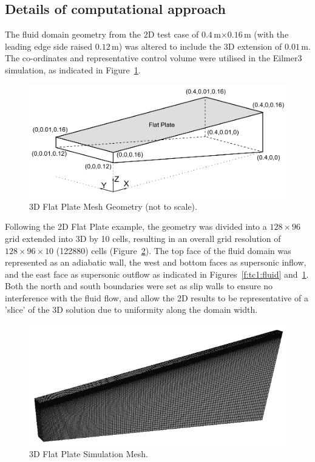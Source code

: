 \subsection{Details of computational approach}
The fluid domain geometry from the 2D test case of $0.4$\,m$\times0.16$\,m (with the leading edge side raised $0.12$\,m) was altered to include the 3D extension of $0.01$\,m. The co-ordinates and representative control volume were utilised in the Eilmer3 simulation, as indicated in Figure~\ref{f:tc1:geometry}.
%
\begin{figure}[htbp]
 \begin{center}
  \includegraphics[width=12cm]{./chap6-3Dflatplate/figs/3Dcoordinates.pdf}
  \caption{3D Flat Plate Mesh Geometry (not to scale).}
  \label{f:tc1:geometry}
 \end{center}
\end{figure}
%
Following the 2D Flat Plate example, the geometry was divided into a $128\times96$ grid extended into 3D by 10 cells, resulting in an overall grid resolution of $128\times96\times10$ (122880) cells (Figure~\ref{f:tc1:mesh}). 
The top face of the fluid domain was represented as an adiabatic wall, the west and bottom faces as supersonic inflow, and the east face as supersonic outflow as indicated in Figures~\ref{f:tc1:fluid} and~\ref{f:tc1:geometry}. Both the north and south boundaries were set as slip walls to ensure no interference with the fluid flow, and allow the 2D results to be representative of a 'slice' of the 3D solution due to uniformity along the domain width.
%
\begin{figure}[htbp]
 \begin{center}
  \includegraphics[width=12cm]{./chap6-3Dflatplate/figs/tc1meshbw.png}
  \caption{3D Flat Plate Simulation Mesh.}
  \label{f:tc1:mesh}
 \end{center}
\end{figure}
